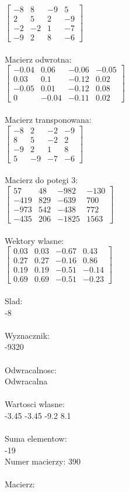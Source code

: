 \documentclass[a4paper,12pt]{article}
\begin{document}
$\begin{bmatrix} -8&8&-9&5\\2&5&2&-9\\-2&-2&1&-7\\-9&2&8&-6 \end{bmatrix}$
\\
\\
Macierz odwrotna:\\

$\begin{bmatrix} -0.04&0.06&-0.06&-0.05\\0.03&0.1&-0.12&0.02\\-0.05&0.01&-0.12&0.08\\0&-0.04&-0.11&0.02 \end{bmatrix}$
\\
\\
Macierz transponowana:\\

$\begin{bmatrix} -8&2&-2&-9\\8&5&-2&2\\-9&2&1&8\\5&-9&-7&-6 \end{bmatrix}$
\\
\\
Macierz do potegi 3:\\

$\begin{bmatrix} 57&48&-982&-130\\-419&829&-639&700\\-973&542&-438&772\\-435&206&-1825&1563 \end{bmatrix}$
\\
\\
Wektory wlasne:\\

$\begin{bmatrix} 0.03&0.03&-0.67&0.43\\0.27&0.27&-0.16&0.86\\0.19&0.19&-0.51&-0.14\\0.69&0.69&-0.51&-0.23 \end{bmatrix}$
\\
\\
Slad:\\
-8
\\
\\
Wyznacznik:\\
-9320
\\
\\
Odwracalnosc:\\
Odwracalna
\\
\\
Wartosci wlasne:\\
-3.45 -3.45 -9.2 8.1
\\
\\
Suma elementow:\\
-19
\\
\newpage
Numer macierzy:
390
\\
\\
Macierz:\\
\end{document}
